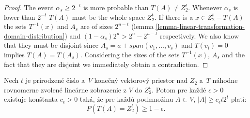 \begin{proof}
The event $\alpha_s \geq 2^{-t}$ is more probable than $T(A) \neq Z_2^t$. Whenever $\alpha_s$ is lower than $2^{-t}$ $T(A)$ must be the whole space $Z_2^t$. If there is a $x \in Z_2^t - T(A)$ the sets $T^{-1}(x)$ and $A_s$ are of sizes $2^{u-t}$ (lemma \ref{lemma-linear-transformation-domain-distribution}) and $(1 - \alpha_s)2^u > 2^u - 2^{u-t}$ respectively. We also know that they must be disjoint since $A_s = a + span(v_1, \dots, v_s)$ and $T(v_i) = 0$ implies $T(A) = T(A_s)$. Considering the sizes of the sets $T^{-1}(x)$, $A_s$ and the fact that they are disjoint we immediately obtain a contradiction.
\end{proof}

\begin{theorem}
\label{theorem-set-onto-by-linear-transform}
Nech $t$ je prirodzené číslo a~$V$ konečný vektorový priestor nad $Z_2$ a~$T$ náhodne rovnomerne zvolené lineárne zobrazenie z $V$ do $Z_2^{t}$. Potom pre každé $\epsilon > 0$ existuje konštanta $c_\epsilon > 0$ taká, že pre každú podmnožinu $A \subset V$, $|A| \geq c_\epsilon t 2^t$ platí:
\begin{displaymath}
P(T(A) = Z_2^t) \geq 1 - \epsilon \textit{.}
\end{displaymath}
\end{theorem}
